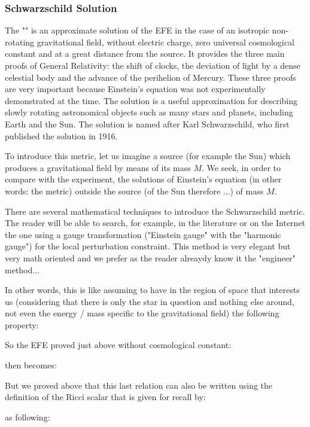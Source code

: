 	\pagebreak
	\subsubsection{Schwarzschild Solution}
	The "" is an approximate solution of the EFE  in the case of an isotropic non-rotating gravitational field, without electric charge, zero universal cosmological constant  and at a great distance from the source. It provides the three main proofs of General Relativity: the shift of clocks, the deviation of light by a dense celestial body and the advance of the perihelion of Mercury. These three proofs are very important because Einstein's equation was not experimentally demonstrated at the time.  The solution is a useful approximation for describing slowly rotating astronomical objects such as many stars and planets, including Earth and the Sun. The solution is named after Karl Schwarzschild, who first published the solution in 1916.

	To introduce this metric, let us imagine a source (for example the Sun) which produces a gravitational field by means of its mass $M$. We seek, in order to compare with the experiment, the solutions of Einstein's equation (in other words: the metric) outside the source (of the Sun therefore ...) of mass $M$.
	\begin{tcolorbox}[title=Remark,colframe=black,arc=10pt]
	There are several mathematical techniques to introduce the Schwarzschild metric. The reader will be able to search, for example, in the literature or on the Internet the one using a gauge transformation ("Einstein gauge" with the "harmonic gauge") for the local perturbation constraint. This method is very elegant but very math oriented and we prefer as the reader alreaydy know it the "engineer" method...
	\end{tcolorbox}
	In other words, this is like assuming to have in the region of space that interests us (considering that there is only the star in question and nothing else around, not even the energy / mass specific to the gravitational field) the following property:
	
	So the EFE proved just above without cosmological constant:
	
	then becomes:
	
	But we proved above that this last relation can also be written using the definition of the Ricci scalar that is given for recall by:
	
	as following:
	
